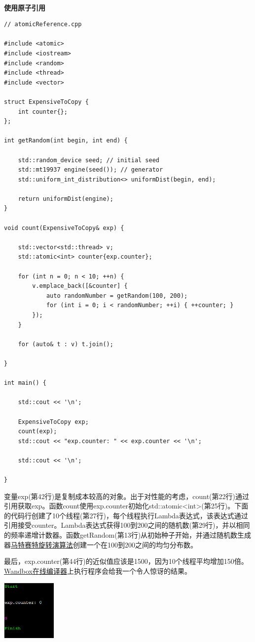 \hspace*{\fill} \\ %
\noindent
\textbf{使用原子引用}
\begin{lstlisting}[style=styleCXX]
// atomicReference.cpp

#include <atomic>
#include <iostream>
#include <random>
#include <thread>
#include <vector>

struct ExpensiveToCopy {
	int counter{};
};

int getRandom(int begin, int end) {
	
	std::random_device seed; // initial seed
	std::mt19937 engine(seed()); // generator
	std::uniform_int_distribution<> uniformDist(begin, end);
	
	return uniformDist(engine);
}

void count(ExpensiveToCopy& exp) {

	std::vector<std::thread> v;
	std::atomic<int> counter{exp.counter};
	
	for (int n = 0; n < 10; ++n) {
		v.emplace_back([&counter] {
			auto randomNumber = getRandom(100, 200);
			for (int i = 0; i < randomNumber; ++i) { ++counter; }
		});
	}
	
	for (auto& t : v) t.join();

}

int main() {
	
	std::cout << '\n';
	
	ExpensiveToCopy exp;
	count(exp);
	std::cout << "exp.counter: " << exp.counter << '\n';
	
	std::cout << '\n';

}
\end{lstlisting}

变量exp(第42行)是复制成本较高的对象。出于对性能的考虑，count(第22行)通过引用获取exp。函数count使用exp.counter初始化std::atomic<int>(第25行)。下面的代码行创建了10个线程(第27行)，每个线程执行Lambda表达式，该表达式通过引用接受counter。Lambda表达式获得100到200之间的随机数(第29行)，并以相同的频率递增计数器。函数getRandom(第13行)从初始种子开始，并通过随机数生成器\href{https://en.wikipedia.org/wiki/Mersenne_Twister}{马特赛特旋转演算法}创建一个在100到200之间的均匀分布数。

最后，exp.counter(第44行)的近似值应该是1500，因为10个线程平均增加150倍。\href{https://wandbox.org/}{Wandbox在线编译器}上执行程序会给我一个令人惊讶的结果。

\begin{center}
\includegraphics[width=0.2\textwidth]{content/3/chapter6/images/8.png}\\
\end{center}

